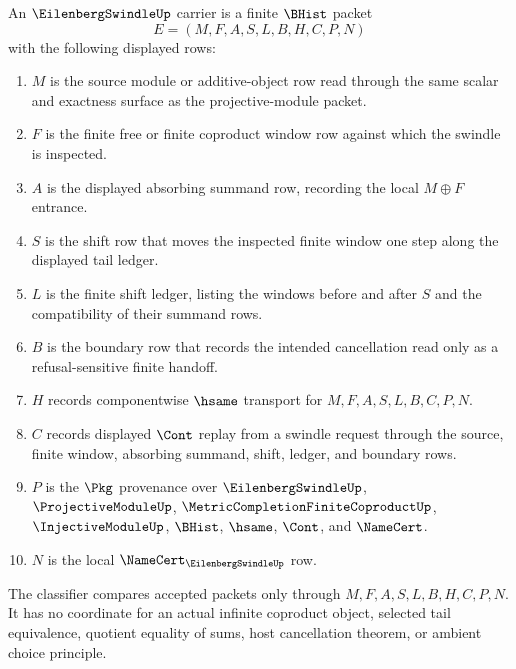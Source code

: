 \begin{definition}
\label{def:eilenberg-swindle-carrier}
An $\EilenbergSwindleUp$ carrier is a finite $\BHist$ packet
$$
E=(M,F,A,S,L,B,H,C,P,N)
$$
with the following displayed rows:
\begin{enumerate}
\item $M$ is the source module or additive-object row read through the same scalar and exactness surface as the projective-module packet.
\item $F$ is the finite free or finite coproduct window row against which the swindle is inspected.
\item $A$ is the displayed absorbing summand row, recording the local $M\oplus F$ entrance.
\item $S$ is the shift row that moves the inspected finite window one step along the displayed tail ledger.
\item $L$ is the finite shift ledger, listing the windows before and after $S$ and the compatibility of their summand rows.
\item $B$ is the boundary row that records the intended cancellation read only as a refusal-sensitive finite handoff.
\item $H$ records componentwise $\hsame$ transport for $M,F,A,S,L,B,C,P,N$.
\item $C$ records displayed $\Cont$ replay from a swindle request through the source, finite window, absorbing summand, shift, ledger, and boundary rows.
\item $P$ is the $\Pkg$ provenance over $\EilenbergSwindleUp$, $\ProjectiveModuleUp$, $\MetricCompletionFiniteCoproductUp$, $\InjectiveModuleUp$, $\BHist$, $\hsame$, $\Cont$, and $\NameCert$.
\item $N$ is the local $\NameCert_{\EilenbergSwindleUp}$ row.
\end{enumerate}
The classifier compares accepted packets only through $M,F,A,S,L,B,H,C,P,N$. It has no coordinate for an actual infinite coproduct object, selected tail equivalence, quotient equality of sums, host cancellation theorem, or ambient choice principle.
\end{definition}

